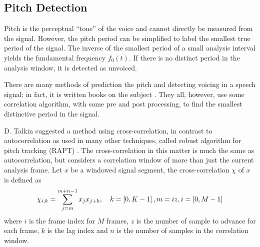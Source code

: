 \subsection{Pitch Detection} %
\label{sub:pitch_detection}
Pitch is the perceptual ``tone'' of the voice and cannot directly be measured from the signal. However, the pitch period can be simplified to label the smallest true period of the signal. The inverse of the smallest period of a small analysis interval yields the fundamental frequency $f_0(t)$. If there is no distinct period in the analysis window, it is detected as unvoiced.

There are many methods of prediction the pitch and detecting voicing in a speech signal; in fact, it is written books on the subject \cite{kleijn95}. They all, however, use some correlation algorithm, with some pre and post processing, to find the smallest distinctive period in the signal.

D. Talkin suggested a method using cross-correlation, in contrast to autocorrelation as used in many other techniques, called robust algorithm for pitch tracking (RAPT) \cite{talkin95}. The cross-correlation in this matter is much the same as autocorrelation, but considers a correlation window of more than just the current analysis frame. Let $x$ be a windowed signal segment, the cross-correlation $\chi$ of $x$ is defined as
\begin{equation}
	\chi_{i,k} = \sum_{j=m}^{m+n-1}x_j x_{j+k}, \quad k=\left[0,K-1\right],m=iz,i=\left[0,M-1\right]
\end{equation}
where $i$ is the frame index for $M$ frames, $z$ is the number of sample to advance for each frame, $k$ is the lag index and $n$ is the number of samples in the correlation window.

